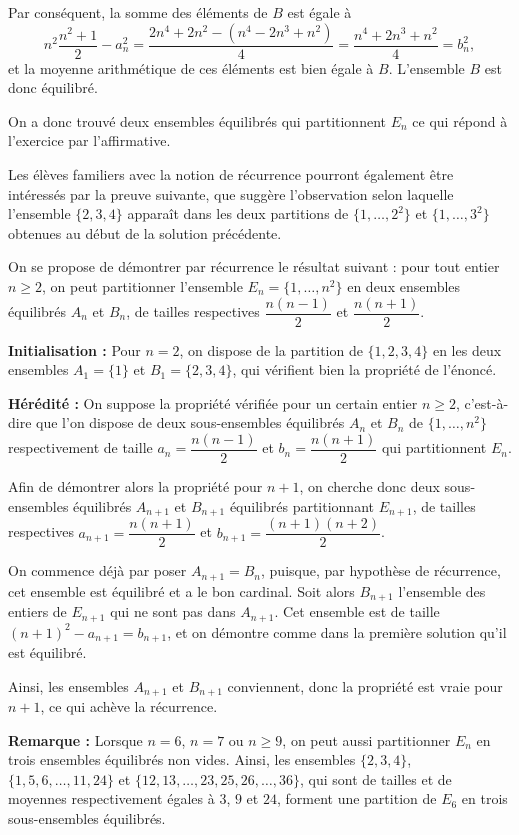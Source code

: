 Par conséquent, la somme des éléments de $B$ est égale à
$$n^2 \dfrac{n^2+1}{2} - a_n^2 =
\dfrac{2n^4+2n^2 - (n^4-2n^3+n^2)}{4} =
\dfrac{n^4+2n^3+n^2}{4} = b_n^2,$$
et la moyenne arithmétique de ces éléments est bien égale
à $B$. L'ensemble $B$ est donc équilibré.

On a donc trouvé deux ensembles équilibrés qui partitionnent $E_n$ ce qui répond à l'exercice par l'affirmative.


\altsol
 
Les élèves familiers avec la notion de récurrence pourront également être intéressés par la preuve suivante, que
suggère l'observation selon laquelle l'ensemble $\{2,3,4\}$
apparaît dans les deux partitions de $\{1,\ldots,2^2\}$ et
$\{1,\ldots,3^2\}$
obtenues au début de la solution précédente.

On se propose de démontrer par récurrence le résultat suivant : pour tout entier $n\ge 2$, on peut partitionner
l'ensemble $E_n = \{1,\ldots,n^2\}$ en deux
ensembles équilibrés $A_n$ et $B_n$, de tailles respectives $\dfrac{n(n-1)}{2}$ et $\dfrac{n(n+1)}{2}$.

\textbf{Initialisation :} Pour $n=2$, on dispose de la partition de $\{1,2,3,4\}$ en les deux ensembles $A_1 = \{1\}$ et $B_1 = \{2,3,4\}$, qui vérifient bien la propriété de l'énoncé.

\medskip

\textbf{Hérédité :} On suppose la propriété vérifiée pour un certain entier $n\ge 2$, c'est-à-dire que l'on dispose de deux sous-ensembles équilibrés $A_n$ et $B_n$ de $\{1,\ldots ,n^2\}$ respectivement de taille $a_n = \dfrac{n(n-1)}{2}$ et $b_n = \dfrac{n(n+1)}{2}$ qui partitionnent $E_n$.

Afin de démontrer alors la propriété pour $n+1$, on cherche
donc deux sous-ensembles équilibrés $A_{n+1}$ et $B_{n+1}$ équilibrés partitionnant $E_{n+1}$, de tailles
respectives $a_{n+1} = \dfrac{n(n+1)}{2}$ et
$b_{n+1} = \dfrac{(n+1)(n+2)}{2}$.

On commence déjà par poser $A_{n+1} = B_n$,
puisque, par hypothèse de récurrence, cet ensemble est équilibré et a le bon cardinal.
Soit alors $B_{n+1}$ l'ensemble des entiers de $E_{n+1}$ qui ne sont pas dans $A_{n+1}$. Cet ensemble est de taille
$(n+1)^2 - a_{n+1} = b_{n+1}$, et on démontre comme dans la
première solution qu'il est équilibré.

Ainsi, les ensembles $A_{n+1}$ et $B_{n+1}$ conviennent, donc
la propriété est vraie pour $n+1$, ce qui achève la récurrence.

\medskip

\textbf{Remarque :}
Lorsque $n=6$, $n=7$ ou $n \ge 9$, on peut aussi partitionner $E_n$ en trois ensembles équilibrés non vides. Ainsi, les ensembles
$\{2,3,4\}$, $\{1,5,6,\ldots,11,24\}$ et
$\{12,13,\ldots,23,25,26,\ldots,36\}$, qui sont de tailles et de moyennes respectivement égales à $3$, $9$ et $24$, forment une partition de $E_6$ en trois sous-ensembles équilibrés.
